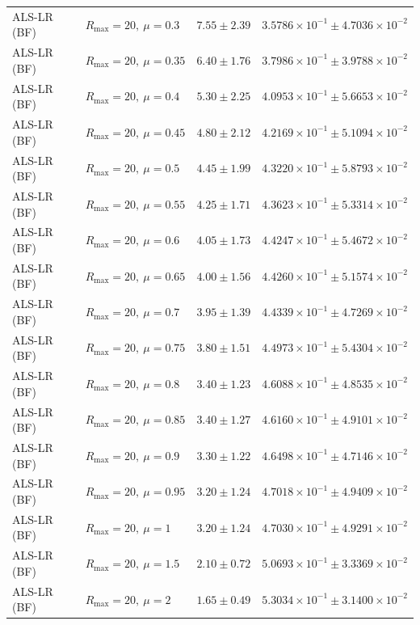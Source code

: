 \begin{table}[t]
\begin{tabular}{@{}llcc@{}}
ALS-LR (BF) & \(R_{\max}=20,\ \mu=0.3\) & \(7.55 \pm 2.39\) & \(3.5786{\times}10^{-1} \pm 4.7036{\times}10^{-2}\) \\
ALS-LR (BF) & \(R_{\max}=20,\ \mu=0.35\) & \(6.40 \pm 1.76\) & \(3.7986{\times}10^{-1} \pm 3.9788{\times}10^{-2}\) \\
ALS-LR (BF) & \(R_{\max}=20,\ \mu=0.4\) & \(5.30 \pm 2.25\) & \(4.0953{\times}10^{-1} \pm 5.6653{\times}10^{-2}\) \\
ALS-LR (BF) & \(R_{\max}=20,\ \mu=0.45\) & \(4.80 \pm 2.12\) & \(4.2169{\times}10^{-1} \pm 5.1094{\times}10^{-2}\) \\
ALS-LR (BF) & \(R_{\max}=20,\ \mu=0.5\) & \(4.45 \pm 1.99\) & \(4.3220{\times}10^{-1} \pm 5.8793{\times}10^{-2}\) \\
ALS-LR (BF) & \(R_{\max}=20,\ \mu=0.55\) & \(4.25 \pm 1.71\) & \(4.3623{\times}10^{-1} \pm 5.3314{\times}10^{-2}\) \\
ALS-LR (BF) & \(R_{\max}=20,\ \mu=0.6\) & \(4.05 \pm 1.73\) & \(4.4247{\times}10^{-1} \pm 5.4672{\times}10^{-2}\) \\
ALS-LR (BF) & \(R_{\max}=20,\ \mu=0.65\) & \(4.00 \pm 1.56\) & \(4.4260{\times}10^{-1} \pm 5.1574{\times}10^{-2}\) \\
ALS-LR (BF) & \(R_{\max}=20,\ \mu=0.7\) & \(3.95 \pm 1.39\) & \(4.4339{\times}10^{-1} \pm 4.7269{\times}10^{-2}\) \\
ALS-LR (BF) & \(R_{\max}=20,\ \mu=0.75\) & \(3.80 \pm 1.51\) & \(4.4973{\times}10^{-1} \pm 5.4304{\times}10^{-2}\) \\
ALS-LR (BF) & \(R_{\max}=20,\ \mu=0.8\) & \(3.40 \pm 1.23\) & \(4.6088{\times}10^{-1} \pm 4.8535{\times}10^{-2}\) \\
ALS-LR (BF) & \(R_{\max}=20,\ \mu=0.85\) & \(3.40 \pm 1.27\) & \(4.6160{\times}10^{-1} \pm 4.9101{\times}10^{-2}\) \\
ALS-LR (BF) & \(R_{\max}=20,\ \mu=0.9\) & \(3.30 \pm 1.22\) & \(4.6498{\times}10^{-1} \pm 4.7146{\times}10^{-2}\) \\
ALS-LR (BF) & \(R_{\max}=20,\ \mu=0.95\) & \(3.20 \pm 1.24\) & \(4.7018{\times}10^{-1} \pm 4.9409{\times}10^{-2}\) \\
ALS-LR (BF) & \(R_{\max}=20,\ \mu=1\) & \(3.20 \pm 1.24\) & \(4.7030{\times}10^{-1} \pm 4.9291{\times}10^{-2}\) \\
ALS-LR (BF) & \(R_{\max}=20,\ \mu=1.5\) & \(2.10 \pm 0.72\) & \(5.0693{\times}10^{-1} \pm 3.3369{\times}10^{-2}\) \\
ALS-LR (BF) & \(R_{\max}=20,\ \mu=2\) & \(1.65 \pm 0.49\) & \(5.3034{\times}10^{-1} \pm 3.1400{\times}10^{-2}\) \\

\end{tabular}
\end{table}
